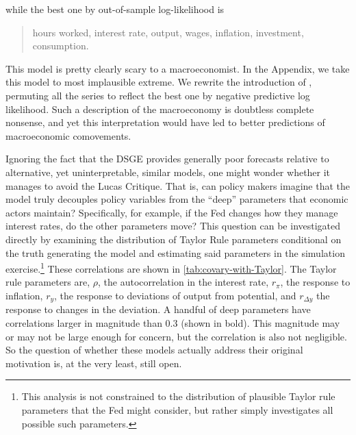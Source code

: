 \documentclass[11pt]{article}
\begin{document}
\noindent while the best one by out-of-sample log-likelihood is

\begin{quotation}
hours worked, interest rate, output, wages, inflation, investment, consumption.
\end{quotation}

\noindent This model is pretty clearly scary to a macroeconomist. In the
Appendix, we take this model to most implausible extreme. We rewrite the
introduction of \citet{SmetsWouters2007}, permuting all the series to
reflect the best one by negative predictive log likelihood. Such a
description of the macroeconomy is doubtless complete nonsense, and yet
this interpretation would have led to better predictions of
macroeconomic comovements.

Ignoring the fact that the DSGE provides generally poor forecasts
relative to alternative, yet uninterpretable, similar models, one might
wonder whether it manages to avoid the Lucas Critique. That is, can
policy makers imagine that the model truly decouples policy variables
from the ``deep'' parameters that economic actors maintain?
Specifically, for example, if the Fed changes how they manage interest
rates, do the other parameters move? This question can be investigated
directly by examining the distribution of Taylor Rule parameters
conditional on the truth generating the model and estimating said
parameters in the simulation exercise.\footnote{This analysis is not
  constrained to the distribution of plausible Taylor rule parameters
  that the Fed might consider, but rather simply investigates all
  possible such parameters.} These correlations are shown in
\autoref{tab:covary-with-Taylor}. The Taylor rule parameters are,
\(\rho\), the autocorrelation in the interest rate, \(r_\pi\), the
response to inflation, \(r_y\), the response to deviations of output
from potential, and \(r_{\Delta y}\) the response to changes in the
deviation. A handful of deep parameters have correlations larger in
magnitude than 0.3 (shown in bold). This magnitude may or may not be
large enough for concern, but the correlation is also not negligible. So
the question of whether these models actually address their original
motivation is, at the very least, still open.
\end{document}
